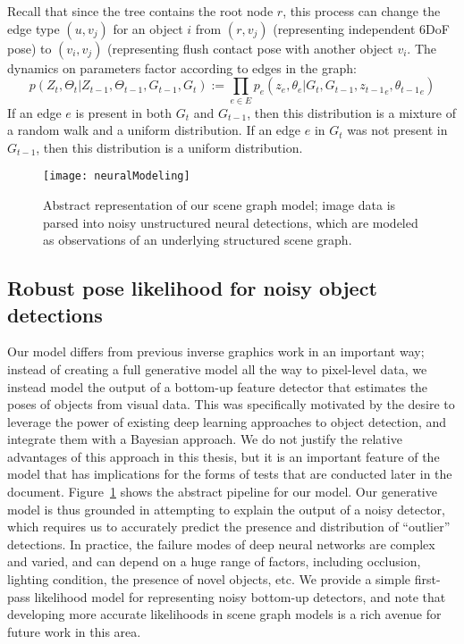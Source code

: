 Recall that since the tree contains the root node $r$, this process can change the edge type $(u, v_j)$ for an object $i$ from $(r, v_j)$ (representing independent 6DoF pose) to $(v_i, v_j)$ (representing flush contact pose with another object $v_i$.
The dynamics on parameters factor according to edges in the graph:
\begin{equation}
    p(Z_t, \Theta_t | Z_{t-1}, \Theta_{t-1}, G_{t-1}, G_t) := \prod_{e \in E} p_e(z_e, \theta_e | G_t, G_{t-1}, {z_{t-1}}_e, {\theta_{t-1}}_e)
\end{equation}
If an edge $e$ is present in both $G_t$ and $G_{t-1}$, then this distribution is a mixture of a random walk and a uniform distribution.
If an edge $e$ in $G_t$ was not present in $G_{t-1}$, then this distribution is a uniform distribution.

\begin{figure}[H]
  \texttt{[image: neuralModeling]}
  \caption{
    Abstract representation of our scene graph model; image data is parsed into noisy unstructured neural detections, which are modeled as observations of an underlying structured scene graph.
  }
  \label{fig:neuralModeling}
\end{figure}
\subsection{Robust pose likelihood for noisy object detections}
Our model differs from previous inverse graphics work in an important way; instead of creating a full generative model all the way to pixel-level data, we instead model the output of a bottom-up feature detector that estimates the poses of objects from visual data.
This was specifically motivated by the desire to leverage the power of existing deep learning approaches to object detection, and integrate them with a Bayesian approach.
We do not justify the relative advantages of this approach in this thesis, but it is an important feature of the model that has implications for the forms of tests that are conducted later in the document.
Figure~\ref{fig:neuralModeling} shows the abstract pipeline for our model.
Our generative model is thus grounded in attempting to explain the output of a noisy detector, which requires us to accurately predict the presence and distribution of ``outlier'' detections.
In practice, the failure modes of deep neural networks are complex and varied, and can depend on a huge range of factors, including occlusion, lighting condition, the presence of novel objects, etc.
We provide a simple first-pass likelihood model for representing noisy bottom-up detectors, and note that developing more accurate likelihoods in scene graph models is a rich avenue for future work in this area.


